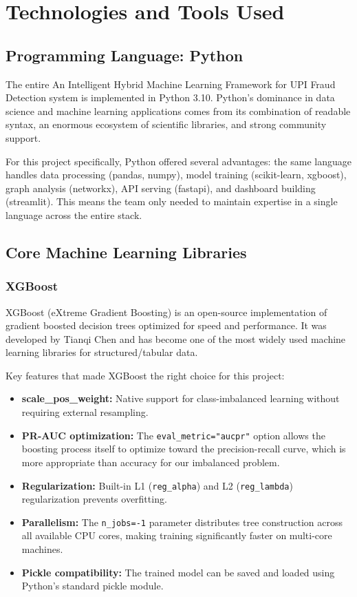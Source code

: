 \chapter{Technologies and Tools Used}

\section{Programming Language: Python}

The entire An Intelligent Hybrid Machine Learning Framework for UPI Fraud Detection system is implemented in Python 3.10. Python's dominance in data science and machine learning applications comes from its combination of readable syntax, an enormous ecosystem of scientific libraries, and strong community support.

For this project specifically, Python offered several advantages: the same language handles data processing (pandas, numpy), model training (scikit-learn, xgboost), graph analysis (networkx), API serving (fastapi), and dashboard building (streamlit). This means the team only needed to maintain expertise in a single language across the entire stack.

\section{Core Machine Learning Libraries}

\subsection{XGBoost}

XGBoost (eXtreme Gradient Boosting) \cite{chen2016} is an open-source implementation of gradient boosted decision trees optimized for speed and performance. It was developed by Tianqi Chen and has become one of the most widely used machine learning libraries for structured/tabular data.

Key features that made XGBoost the right choice for this project:

\begin{itemize}
    \item \textbf{scale\_pos\_weight:} Native support for class-imbalanced learning without requiring external resampling.
    \item \textbf{PR-AUC optimization:} The \texttt{eval\_metric="aucpr"} option allows the boosting process itself to optimize toward the precision-recall curve, which is more appropriate than accuracy for our imbalanced problem.
    \item \textbf{Regularization:} Built-in L1 (\texttt{reg\_alpha}) and L2 (\texttt{reg\_lambda}) regularization prevents overfitting.
    \item \textbf{Parallelism:} The \texttt{n\_jobs=-1} parameter distributes tree construction across all available CPU cores, making training significantly faster on multi-core machines.
    \item \textbf{Pickle compatibility:} The trained model can be saved and loaded using Python's standard pickle module.
\end{itemize}

